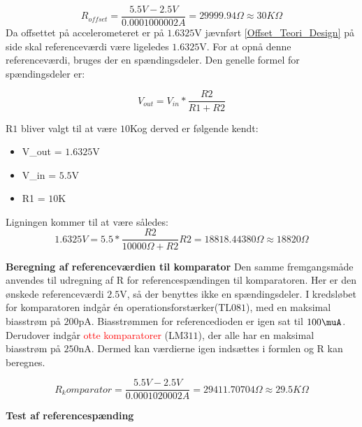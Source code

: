 \begin{equation}
R_{offset}=\frac{5.5V-2.5V}{0.0001000002A}=29999.94\Omega \approx 30K\Omega
\end{equation}  
Da offsettet på accelerometeret er på $1.6325$V jævnført \ref{Offset_Teori_Design} på side \pageref{Offset_Teori_Design} skal referenceværdi være ligeledes $1.6325$V. For at opnå denne referenceværdi, bruges der en spændingsdeler. Den genelle formel for spændingsdeler er: 

\begin{equation} \label{Spaendingsdeler}
V_{out}=V_{in}*\dfrac{R2}{R1+R2}
\end{equation}

R$1$ bliver valgt til at være $10$K\Omega og derved er følgende kendt: 
\begin{itemize}
\item V_{out}  = $1.6325$V
\item V_{in} = $5.5$V
\item R1 = $10$K\Omega
\end{itemize}
Ligningen kommer til at være således: 
\begin{equation}
1.6325V = 5.5* \dfrac{R2}{10000\Omega+R2} 
R2 = 18818.44380\Omega \approx 18820\Omega
\end{equation}

\noindet \textbf{Beregning af referenceværdien til komparator}
Den samme fremgangsmåde anvendes til udregning af R for referencespændingen til komparatoren. Her er den ønskede referenceværdi  $2.5$V, så der benyttes ikke en spændingsdeler.  I kredsløbet for komparatoren indgår én operationsforstærker(TL$081$), med en maksimal biasstrøm på $200$pA. Biasstrømmen for referencedioden er igen sat til $100\muA$. Derudover indgår \textcolor{red}{otte komparatorer} (LM$311$), der alle har en maksimal biasstrøm på $250$nA. Dermed kan værdierne igen indsættes i formlen og R kan beregnes.

\begin{equation}
R_komparator=\frac{5.5V-2.5V}{0.0001020002A}=29411.70704\Omega \approx 29.5K\Omega 
\end{equation} 

\textbf{Test af referencespænding}


 